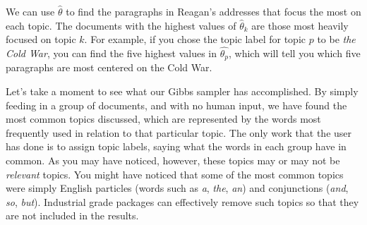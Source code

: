 We can use $\widehat{\theta}$ to find the paragraphs in Reagan's addresses that focus the most on each topic. The documents with the highest values of $\widehat{\theta}_{k}$ are those most heavily focused on topic $k$.  For example, if you chose the topic label for topic $p$ to be \emph{the Cold War}, you can find the five highest values in $\widehat{\theta_{p}}$, which will tell you which five paragraphs are most centered on the Cold War.

Let's take a moment to see what our Gibbs sampler has accomplished.  By simply feeding in a group of documents, and with no human input, we have found the most common topics discussed, which are represented by the words most frequently used in relation to that particular topic.  The only work that the user has done is to assign topic labels, saying what the words in each group have in common.  As you may have noticed, however, these topics may or may not be \emph{relevant} topics.  You might have noticed that some of the most common topics were simply English particles (words such as \emph{a}, \emph{the}, \emph{an}) and conjunctions (\emph{and}, \emph{so}, \emph{but}).  Industrial grade packages can effectively remove such topics so that they are not included in the results.

